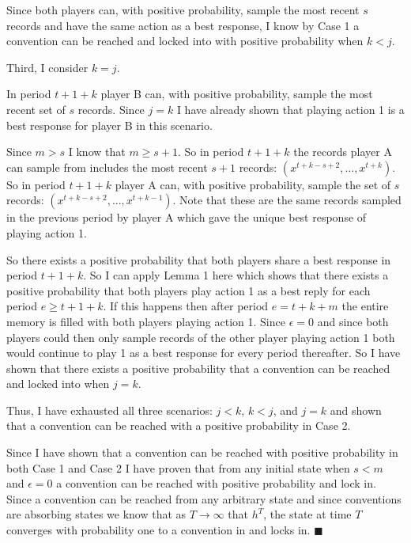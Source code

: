 \documentclass{article}
\begin{document}
\vskip6pt

Since both players can, with positive probability, sample the most recent $s$ records and have the same action as a best response, I know by Case 1 a convention can be reached and locked into with positive probability when $k<j$.

\vskip18pt

Third, I consider $k=j$.

\vskip6pt

In period $t+1+k$ player B can, with positive probability, sample the most recent set of $s$ records. Since $j=k$ I have already shown that playing action 1 is a best response for player B in this scenario.

\vskip6pt

Since $m>s$ I know that $m \geq s+1$. So in period $t+1+k$ the records player A can sample from includes the most recent $s+1$ records: $(x^{t+k-s+2},...,x^{t+k})$. So in period $t+1+k$ player A can, with positive probability, sample the set of $s$ records: $(x^{t+k-s+2},...,x^{t+k-1})$. Note that these are the same records sampled in the previous period by player A which gave the unique best response of playing action 1.

\vskip6pt

So there exists a positive probability that both players share a best response in period $t+1+k$. So I can apply Lemma 1 here which shows that there exists a positive probability that both players play action 1 as a best reply for each period $e \geq t+1+k$. If this happens then after period $e=t+k+m$ the entire memory is filled with both players playing action 1. Since $\epsilon=0$ and since both players could then only sample records of the other player playing action 1 both would continue to play 1 as a best response for every period thereafter. So I have shown that there exists a positive probability that a convention can be reached and locked into when $j=k$. 

\vskip12pt

Thus, I have exhausted all three scenarios: $j<k$, $k<j$, and $j=k$ and shown that a convention can be reached with a positive probability in Case 2.

\vskip18pt

Since I have shown that a convention can be reached with positive probability in both Case 1 and Case 2 I have proven that from any initial state when $s<m$ and $\epsilon=0$ a convention can be reached with positive probability and lock in. Since a convention can be reached from any arbitrary state and since conventions are absorbing states we know that as $T \rightarrow \infty$ that $h^T$, the state at time $T$ converges with probability one to a convention in and locks in. $\blacksquare$
\end{document}
